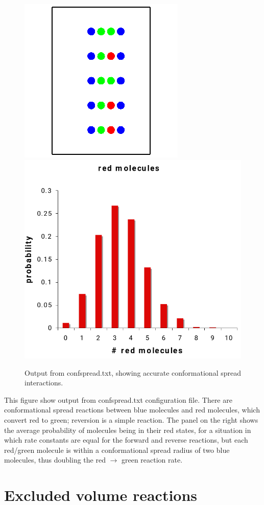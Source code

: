 \documentclass {book}
\begin{document}
\begin{figure}[h]
\centering
\includegraphics[height=5 cm]{figures/image56}
\includegraphics[height=5 cm]{figures/image57}
\caption{Output from confspread.txt, showing accurate conformational spread interactions.}
\label{fig:confspread}
\end{figure}

This figure show output from confspread.txt configuration file. There are conformational spread reactions between blue molecules and red molecules, which convert red to green; reversion is a simple reaction. The panel on the right shows the average probability of molecules being in their red states, for a situation in which rate constants are equal for the forward and reverse reactions, but each red/green molecule is within a conformational spread radius of two blue molecules, thus doubling the red $\rightarrow$ green reaction rate.

\section{Excluded volume reactions}
\end{document}
